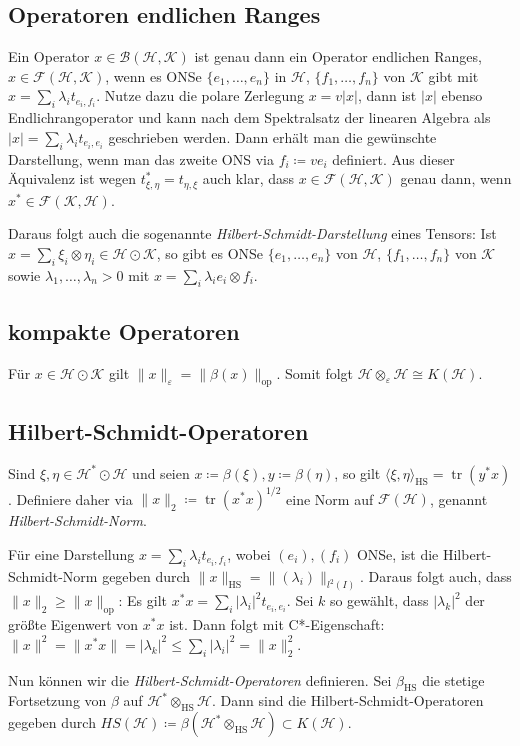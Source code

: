 \documentclass[11pt,a4paper]{scrartcl}
\newcommand{\Hc}{\mathcal{H}}
\newcommand{\Kc}{\mathcal{K}}
\newcommand{\B}{\mathcal{B}}
\newcommand{\F}{\mathcal{F}}
\theoremstyle{plain}
\theoremstyle{definition}
\theoremstyle{remark}
\DeclareMathOperator{\tr}{tr}
\begin{document}
\subsection{Operatoren endlichen Ranges}

Ein Operator $x\in \B(\Hc,\Kc)$ ist genau dann ein Operator endlichen Ranges, $x\in \F(\Hc,\Kc)$, wenn es ONSe $\{e_1,\dots,e_n\}$ in $\Hc$, $\{f_1,\dots,f_n\}$ von $\Kc$ gibt mit $x=\sum_i \lambda_i t_{e_i,f_i}$. Nutze dazu die polare Zerlegung $x=v|x|$, dann ist $|x|$ ebenso Endlichrangoperator und kann nach dem Spektralsatz der linearen Algebra als $|x|=\sum_i \lambda_i t_{e_i,e_i}$ geschrieben werden. Dann erhält man die gewünschte Darstellung, wenn man das zweite ONS via $f_i\coloneqq ve_i$ definiert. Aus dieser Äquivalenz ist wegen $t_{\xi,\eta}^*=t_{\eta,\xi}$ auch klar, dass $x\in\F(\Hc,\Kc)$ genau dann, wenn $x^*\in\F(\Kc,\Hc)$.

Daraus folgt auch die sogenannte \emph{Hilbert-Schmidt-Darstellung} eines Tensors: Ist $x=\sum_i \xi_i\otimes \eta_i \in \Hc\odot \Kc$, so gibt es ONSe $\{e_1,\dots,e_n\}$ von $\Hc$, $\{f_1,\dots,f_n\}$ von $\Kc$ sowie $\lambda_1,\dots,\lambda_n > 0$ mit $x=\sum_i \lambda_i e_i\otimes f_i$.

\subsection{kompakte Operatoren}

Für $x\in \Hc\odot \Kc$ gilt $\|x\|_\varepsilon = \|\beta(x)\|_\mathrm{op}$. Somit folgt $\Hc \otimes_\varepsilon \Hc \cong K(\Hc)$.

\subsection{Hilbert-Schmidt-Operatoren}

Sind $\xi,\eta\in \Hc^*\odot \Hc$ und seien $x\coloneqq \beta(\xi), y\coloneqq \beta(\eta)$, so gilt $\langle \xi, \eta \rangle_\mathrm{HS} = \tr(y^*x)$. Definiere daher via $\|x\|_2 \coloneqq \tr(x^*x)^{1/2}$ eine Norm auf $\F(\Hc)$, genannt \emph{Hilbert-Schmidt-Norm}. 

Für eine Darstellung $x=\sum_i \lambda_i t_{e_i,f_i}$, wobei $(e_i),(f_i)$ ONSe, ist die Hilbert-Schmidt-Norm gegeben durch $\|x\|_\mathrm{HS} = \|(\lambda_i)\|_{l^2(I)}$. Daraus folgt auch, dass $\|x\|_2 \geq \|x\|_\mathrm{op}$: Es gilt $x^*x=\sum_i |\lambda_i|^2 t_{e_i,e_i}$. Sei $k$ so gewählt, dass $|\lambda_k|^2$ der größte Eigenwert von $x^*x$ ist. Dann folgt mit C*-Eigenschaft: $\|x\|^2=\|x^*x\| = |\lambda_k|^2 \leq \sum_i |\lambda_i|^2 = \|x\|_2^2$.

Nun können wir die \emph{Hilbert-Schmidt-Operatoren} definieren. Sei $\beta_\mathrm{HS}$ die stetige Fortsetzung von $\beta$ auf $\Hc^*\otimes_\mathrm{HS} \Hc$. Dann sind die Hilbert-Schmidt-Operatoren gegeben durch $HS(\Hc) \coloneqq \beta(\Hc^*\otimes_\mathrm{HS}\Hc) \subset K(\Hc)$. 
\end{document}
